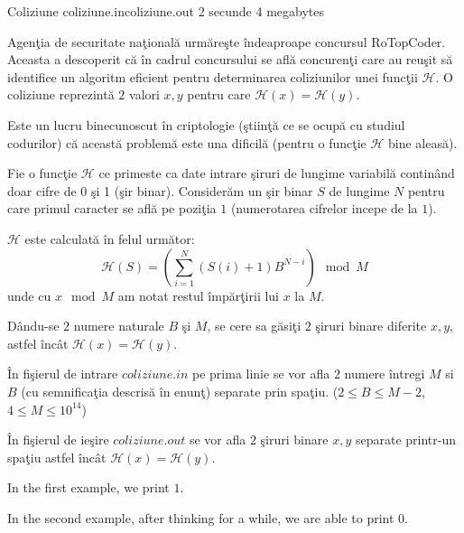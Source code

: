 \begin{problem}{Coliziune}
{coliziune.in}{coliziune.out}
{2 secunde} {4 megabytes}{}

Agen\c{t}ia de securitate na\c{t}ional\u{a} urm\u{a}re\c{s}te \^{i}ndeaproape concursul RoTopCoder. Aceasta a descoperit c\u{a} \^{i}n cadrul concursului se afl\u{a} concuren\c{t}i care au reu\c{s}it s\u{a} identifice un algoritm eficient pentru determinarea coliziunilor unei func\c{t}ii $\mathcal{H}$.
O coliziune reprezint\u{a} $2$ valori $x, y$ pentru care $\mathcal{H}(x) = \mathcal{H}(y)$.

Este un lucru binecunoscut \^{i}n criptologie (\c{s}tiin\c{t}\u{a} ce se ocup\u{a} cu studiul codurilor) c\u{a} aceast\u{a} problem\u{a} este una dificil\u{a} (pentru o func\c{t}ie $\mathcal{H}$ bine aleas\u{a}).

Fie o func\c{t}ie $\mathcal{H}$ ce primeste ca date intrare \c{s}iruri de lungime variabil\u{a} contin\^{a}nd doar cifre de 0 \c{s}i 1 (\c{s}ir binar). Consider\u{a}m un \c{s}ir binar $S$ de lungime $N$ pentru care primul caracter se afl\u{a} pe pozi\c{t}ia $1$ (numerotarea cifrelor incepe de la $1$).

$\mathcal{H}$ este calculat\u{a} \^{i}n felul urm\u{a}tor:
\begin{equation}
\mathcal{H}(S) = (\displaystyle\sum_{i = 1}^{N}{(S(i) + 1) B ^{N - i}}) \mod M
\end{equation}
unde cu $x \mod M$ am notat restul \^{i}mp\u{a}r\c{t}irii lui $x$ la $M$.

D\^{a}ndu-se $2$ numere naturale $B$ \c{s}i $M$, se cere sa g\u{a}si\c{t}i $2$ \c{s}iruri binare diferite $x, y$, astfel \^{i}nc\^{a}t $\mathcal{H}(x) = \mathcal{H}(y)$.

\InputFile

\^{I}n fi\c{s}ierul de intrare $coliziune.in$ pe prima linie se vor afla $2$ numere întregi $M$ si $B$ (cu semnifica\c{t}ia descris\u{a} \^{i}n enun\c{t}) separate prin spa\c{t}iu. ($2 \le B \le M-2$, $4 \le M \le 10^{14}$)

\OutputFile

În fişierul de ie\c{s}ire $coliziune.out$ se vor afla $2$ \c{s}iruri binare $x, y$ separate printr-un spa\c{t}iu astfel \^{i}nc\^a{t} $\mathcal{H}(x) = \mathcal{H}(y)$.

\Examples

\begin{example}
%
%
\end{example}

\Explanations

In the first example, we print $1$.

In the second example, after thinking for a while, we are able to print $0$.

\end{problem}
